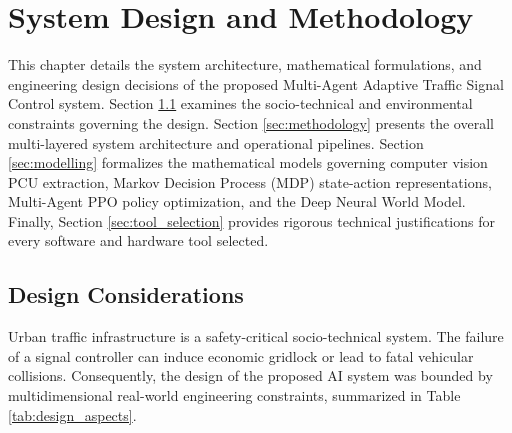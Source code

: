 \chapter{System Design and Methodology}
\label{ch:system_design}

This chapter details the system architecture, mathematical formulations, and engineering design decisions of the proposed Multi-Agent Adaptive Traffic Signal Control system. Section \ref{sec:design_considerations} examines the socio-technical and environmental constraints governing the design. Section \ref{sec:methodology} presents the overall multi-layered system architecture and operational pipelines. Section \ref{sec:modelling} formalizes the mathematical models governing computer vision PCU extraction, Markov Decision Process (MDP) state-action representations, Multi-Agent PPO policy optimization, and the Deep Neural World Model. Finally, Section \ref{sec:tool_selection} provides rigorous technical justifications for every software and hardware tool selected.

\section{Design Considerations}
\label{sec:design_considerations}

Urban traffic infrastructure is a safety-critical socio-technical system. The failure of a signal controller can induce economic gridlock or lead to fatal vehicular collisions. Consequently, the design of the proposed AI system was bounded by multidimensional real-world engineering constraints, summarized in Table \ref{tab:design_aspects}.

